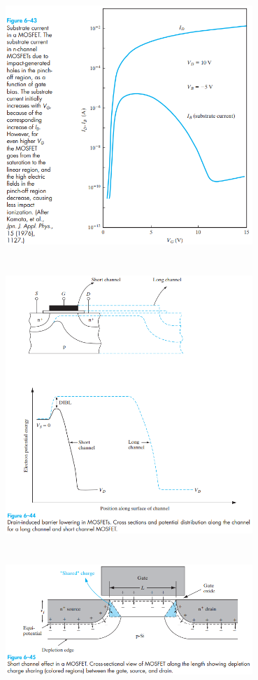 \documentclass[8pt]{article}
\newcommand{\hl}{\noindent\makebox[\linewidth]{\rule{\textwidth}{0.2pt}}}
\begin{document}
\begin{center}
		\includegraphics[width=0.7\textwidth]{fig6-43} \\ \hl \\~\\
		\includegraphics[width=0.7\textwidth]{fig6-44} \\ \hl \\~\\
		\includegraphics[width=0.7\textwidth]{fig6-45} \\ \hl \\~\\

\end{center}
\end{document}
